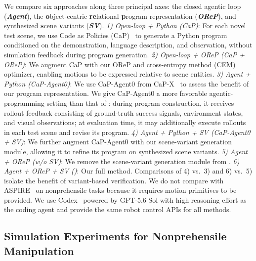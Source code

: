 We compare six approaches along three principal axes: the closed agentic loop (\textbf{\textit{Agent}}), the \textbf{o}bject-centric \textbf{re}lational \textbf{p}rogram representation (\textbf{\textit{OReP}}), and synthesized \textbf{s}cene \textbf{v}ariants (\textbf{\textit{SV}}). 
\textit{1) Open-loop + Python (CaP)}: For each novel test scene, we use Code as Policies (CaP)~\cite{liang2023code} to generate a Python program conditioned on the demonstration, language description, and observation, without simulation feedback during program generation. 
\textit{2) Open-loop + OReP (CaP + OReP)}: We augment CaP with our OReP and cross-entropy method (CEM) optimizer, enabling motions to be expressed relative to scene entities. 
\textit{3) Agent + Python (CaP-Agent0)}: We use CaP-Agent0 from CaP-X~\cite{fu2026cap} to assess the benefit of our program representation. 
We give CaP-Agent0 a more favorable agentic-programming setting than that of \ours: during program construction, it receives rollout feedback consisting of ground-truth success signals, environment states, and visual observations; at evaluation time, it may additionally execute rollouts in each test scene and revise its program. 
\textit{4) Agent + Python + SV (CaP-Agent0 + SV)}: We further augment CaP-Agent0 with our scene-variant generation module, allowing it to refine its program on synthesized scene variants. 
\textit{5) Agent + OReP (\ours w/o SV)}: We remove the scene-variant generation module from \ours. 
\textit{6) Agent + OReP + SV (\ours)}: Our full method. 
Comparisons of 4) vs.\ 3) and 6) vs.\ 5) isolate the benefit of variant-based verification. We do not compare with ASPIRE~\cite{lu2026aspire} on nonprehensile tasks because it requires motion primitives to be provided. We use Codex~\cite{openai_codex} powered by GPT-5.6 Sol with high reasoning effort as the coding agent and provide the same robot control APIs for all methods.

\subsection{Simulation Experiments for Nonprehensile Manipulation}


